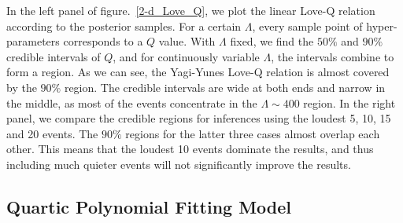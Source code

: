 \documentclass[a4paper,11pt]{article}
\begin{document}
In the left panel of figure.~\ref{2-d_Love_Q}, we plot the linear Love-Q relation according to the posterior samples. For a certain $\Lambda$, every sample point of hyper-parameters corresponds to a $Q$ value. With $\Lambda$ fixed, we find the $50\%$ and $90\%$ credible intervals of $Q$, and for continuously variable $\Lambda$, the intervals combine to form a region. As we can see, the Yagi-Yunes Love-Q relation is almost covered by the $90\%$ region. The credible intervals are wide at both ends and narrow in the middle, as most of the events concentrate in the $\Lambda \sim 400$ region. In the right panel, we compare the credible regions for inferences using the loudest 5, 10, 15 and 20 events. 
The $90\%$ regions for the latter three cases almost overlap each other. This means that the loudest 10 events dominate the results, and thus including much quieter events will not significantly improve the results.

\subsection{Quartic Polynomial Fitting Model}
\label{sec4_2}
\end{document}
